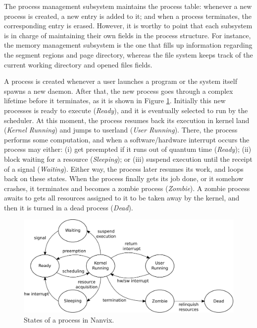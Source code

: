	The process management subsystem maintains the process table:
	whenever a new process is created, a new entry is added to it; and
	when a process terminates, the corresponding entry is erased.
	However, it is worthy to point that each subsystem is in charge of
	maintaining their own fields in the process structure.  For
	instance, the memory management subsystem is the one that fills up
	information regarding the segment regions and page directory,
	whereas the file system keeps track of the current working directory
	and opened files fields.

	A process is created whenever a user launches a program or the
	system itself spawns a new daemon. After that, the new process goes
	through a complex lifetime before it terminates, as it is shown in
	Figure \ref{figure: states of a process in nanvix}.  Initially this
	new processes is ready to execute (\textit{Ready}), and it is
	eventually selected to run by the scheduler. At this moment, the
	process resumes back its execution in kernel land (\textit{Kernel
	Running}) and jumps to userland (\textit{User Running}). There, the
	process performs some computation, and when a software/hardware
	interrupt occurs the process may either: (i) get preempted if it
	runs out of quantum time (\textit{Ready}); (ii) block waiting for a
	resource (\textit{Sleeping}); or (iii) suspend execution until the
	receipt of a signal (\textit{Waiting}).  Either way, the process
	later resumes its work, and loops back on these states.  When the
	process finally gets its job done, or it somehow crashes, it
	terminates and becomes a zombie process (\textit{Zombie}). A zombie
	process awaits to gets all resources assigned to it to be taken away
	by the kernel, and then it is turned in a dead process
	(\textit{Dead}).

	\begin{figure}[t]
		\centering
		\includegraphics[width=\linewidth]{img/process-states}
		\caption{States of a process in Nanvix.}
		\label{figure: states of a process in nanvix}
	\end{figure}

